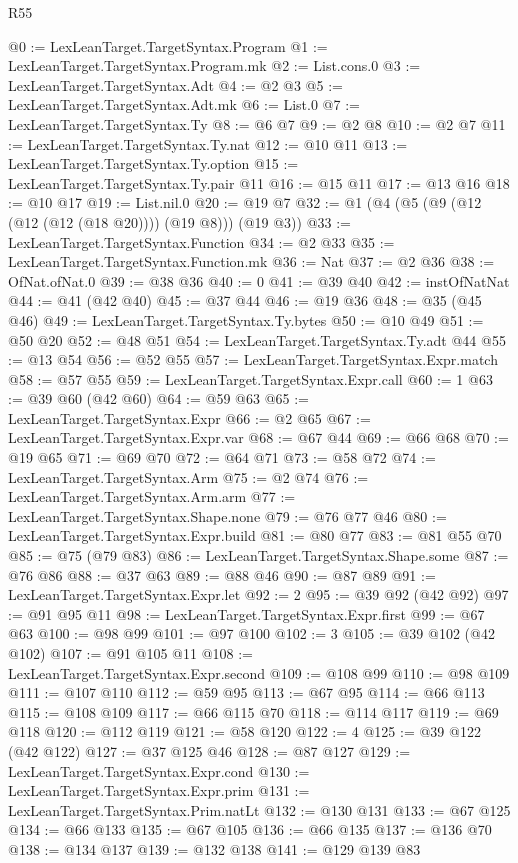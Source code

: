 \begin{lexlean}{R55}
\begin{coremodule}
@0 := LexLeanTarget.TargetSyntax.Program
@1 := LexLeanTarget.TargetSyntax.Program.mk
@2 := List.cons.{0}
@3 := LexLeanTarget.TargetSyntax.Adt
@4 := @2 @3
@5 := LexLeanTarget.TargetSyntax.Adt.mk
@6 := List.{0}
@7 := LexLeanTarget.TargetSyntax.Ty
@8 := @6 @7
@9 := @2 @8
@10 := @2 @7
@11 := LexLeanTarget.TargetSyntax.Ty.nat
@12 := @10 @11
@13 := LexLeanTarget.TargetSyntax.Ty.option
@15 := LexLeanTarget.TargetSyntax.Ty.pair @11
@16 := @15 @11
@17 := @13 @16
@18 := @10 @17
@19 := List.nil.{0}
@20 := @19 @7
@32 := @1 (@4 (@5 (@9 (@12 (@12 (@12 (@18 @20)))) (@19 @8))) (@19 @3))
@33 := LexLeanTarget.TargetSyntax.Function
@34 := @2 @33
@35 := LexLeanTarget.TargetSyntax.Function.mk
@36 := Nat
@37 := @2 @36
@38 := OfNat.ofNat.{0}
@39 := @38 @36
@40 := 0
@41 := @39 @40
@42 := instOfNatNat
@44 := @41 (@42 @40)
@45 := @37 @44
@46 := @19 @36
@48 := @35 (@45 @46)
@49 := LexLeanTarget.TargetSyntax.Ty.bytes
@50 := @10 @49
@51 := @50 @20
@52 := @48 @51
@54 := LexLeanTarget.TargetSyntax.Ty.adt @44
@55 := @13 @54
@56 := @52 @55
@57 := LexLeanTarget.TargetSyntax.Expr.match
@58 := @57 @55
@59 := LexLeanTarget.TargetSyntax.Expr.call
@60 := 1
@63 := @39 @60 (@42 @60)
@64 := @59 @63
@65 := LexLeanTarget.TargetSyntax.Expr
@66 := @2 @65
@67 := LexLeanTarget.TargetSyntax.Expr.var
@68 := @67 @44
@69 := @66 @68
@70 := @19 @65
@71 := @69 @70
@72 := @64 @71
@73 := @58 @72
@74 := LexLeanTarget.TargetSyntax.Arm
@75 := @2 @74
@76 := LexLeanTarget.TargetSyntax.Arm.arm
@77 := LexLeanTarget.TargetSyntax.Shape.none
@79 := @76 @77 @46
@80 := LexLeanTarget.TargetSyntax.Expr.build
@81 := @80 @77
@83 := @81 @55 @70
@85 := @75 (@79 @83)
@86 := LexLeanTarget.TargetSyntax.Shape.some
@87 := @76 @86
@88 := @37 @63
@89 := @88 @46
@90 := @87 @89
@91 := LexLeanTarget.TargetSyntax.Expr.let
@92 := 2
@95 := @39 @92 (@42 @92)
@97 := @91 @95 @11
@98 := LexLeanTarget.TargetSyntax.Expr.first
@99 := @67 @63
@100 := @98 @99
@101 := @97 @100
@102 := 3
@105 := @39 @102 (@42 @102)
@107 := @91 @105 @11
@108 := LexLeanTarget.TargetSyntax.Expr.second
@109 := @108 @99
@110 := @98 @109
@111 := @107 @110
@112 := @59 @95
@113 := @67 @95
@114 := @66 @113
@115 := @108 @109
@117 := @66 @115 @70
@118 := @114 @117
@119 := @69 @118
@120 := @112 @119
@121 := @58 @120
@122 := 4
@125 := @39 @122 (@42 @122)
@127 := @37 @125 @46
@128 := @87 @127
@129 := LexLeanTarget.TargetSyntax.Expr.cond
@130 := LexLeanTarget.TargetSyntax.Expr.prim
@131 := LexLeanTarget.TargetSyntax.Prim.natLt
@132 := @130 @131
@133 := @67 @125
@134 := @66 @133
@135 := @67 @105
@136 := @66 @135
@137 := @136 @70
@138 := @134 @137
@139 := @132 @138
@141 := @129 @139 @83

\end{coremodule}
\end{lexlean}
